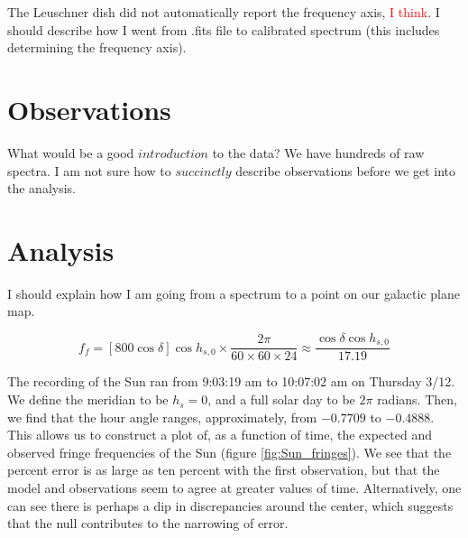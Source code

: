 \documentclass[12pt]{article}
\begin{document}
The Leuschner dish did not automatically report the frequency axis, \textcolor{red}{I think}. I should describe how I went from .fits file to calibrated spectrum (this includes determining the frequency axis).


\section{Observations}

\quad \quad What would be a good $introduction$ to the data? We have hundreds of raw spectra. I am not sure how to $succinctly$ describe observations before we get into the analysis.

\section{Analysis}

\quad \quad I should explain how I am going from a spectrum to a point on our galactic plane map. 

\begin{equation} \label{eq:fringes_expect}
f_f = \left[ 800 \cos \delta \right] \cos h_{s, 0} \times \frac{2 \pi}{60 \times 60 \times 24} \approx \frac{\cos \delta \cos h_{s, 0}}{17.19}
\end{equation} 

The recording of the Sun ran from 9:03:19 am to 10:07:02 am on Thursday 3/12. We define the meridian to be $h_s = 0$, and a full solar day to be $2\pi$ radians. Then, we find that the hour angle ranges, approximately, from $-0.7709$ to $-0.4888$. This allows us to construct a plot of, as a function of time, the expected and observed fringe frequencies of the Sun (figure \ref{fig:Sun_fringes}). We see that the percent error is as large as ten percent with the first observation, but that the model and observations seem to agree at greater values of time. Alternatively, one can see there is perhaps a dip in discrepancies around the center, which suggests that the null contributes to the narrowing of error.
\end{document}
